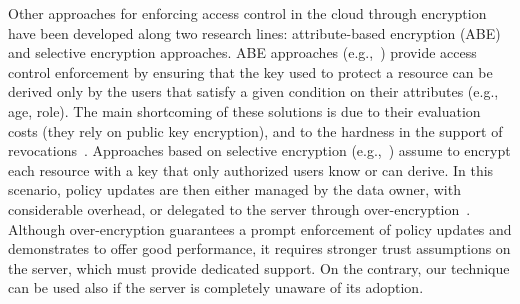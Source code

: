 Other approaches for enforcing access control in the cloud through encryption have been developed along two research lines: attribute-based encryption (ABE) and selective encryption approaches. ABE approaches (e.g.,~\cite{gpsw06,hn11,pbhsr05,ywrl10}) provide access control enforcement by ensuring that the key used to protect a resource can be derived only by the users that satisfy a given condition on their attributes (e.g., age, role). The main shortcoming of these solutions is due to their evaluation costs (they rely on public key encryption), and to the hardness in the support of revocations~\cite{hn11,ywrl10}. Approaches based on selective encryption (e.g.,~\cite{vldb07,tods10,hkd15}) assume to encrypt each resource with a key that only authorized users know or can derive. In this scenario, policy updates are then either managed by the data owner, with considerable overhead, or delegated to the server through over-encryption~\cite{vldb07,tods10}. Although over-encryption guarantees a prompt enforcement of policy updates and demonstrates to offer good performance, it requires stronger trust assumptions on the server, which must provide dedicated support. On the contrary, our technique can be used also if the server is completely unaware of its adoption.

